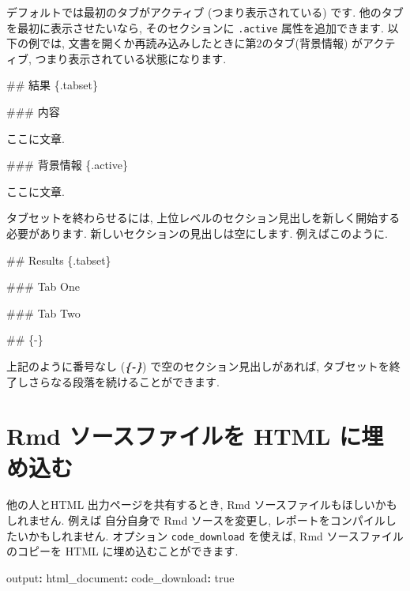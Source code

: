 \documentclass[
  11pt,
  lualatex,ja=standard,jafont=noto]{bxjsreport}
\newenvironment{Shaded}{\begin{snugshade}}{\end{snugshade}}
\newcommand{\AttributeTok}[1]{\textcolor[rgb]{0.77,0.63,0.00}{#1}}
\newcommand{\CharTok}[1]{\textcolor[rgb]{0.31,0.60,0.02}{#1}}
\newcommand{\FunctionTok}[1]{\textcolor[rgb]{0.00,0.00,0.00}{#1}}
\newcommand{\InformationTok}[1]{\textcolor[rgb]{0.56,0.35,0.01}{\textbf{\textit{#1}}}}
\newcommand{\KeywordTok}[1]{\textcolor[rgb]{0.13,0.29,0.53}{\textbf{#1}}}
\newcommand{\NormalTok}[1]{#1}
\begin{document}
デフォルトでは最初のタブがアクティブ (つまり表示されている) です. 他のタブを最初に表示させたいなら, そのセクションに \texttt{.active} 属性を追加できます. 以下の例では, 文書を開くか再読み込みしたときに第2のタブ(背景情報) がアクティブ, つまり表示されている状態になります.

\begin{Shaded}
\begin{Highlighting}[]
\FunctionTok{\#\# 結果 \{.tabset\}}

\FunctionTok{\#\#\# 内容}

\NormalTok{ここに文章.}

\FunctionTok{\#\#\# 背景情報 \{.active\}}

\NormalTok{ここに文章.}
\end{Highlighting}
\end{Shaded}

タブセットを終わらせるには, 上位レベルのセクション見出しを新しく開始する必要があります. 新しいセクションの見出しは空にします. 例えばこのように.

\begin{Shaded}
\begin{Highlighting}[]
\FunctionTok{\#\# Results \{.tabset\}}

\FunctionTok{\#\#\# Tab One}

\FunctionTok{\#\#\# Tab Two}

\FunctionTok{\#\# \{{-}\}}

\NormalTok{上記のように番号なし (}\InformationTok{\textasciigrave{}\{{-}\}\textasciigrave{}}\NormalTok{) で空のセクション見出しがあれば,}
\NormalTok{タブセットを終了しさらなる段落を続けることができます.}
\end{Highlighting}
\end{Shaded}

\hypertarget{embed-rmd}{%
\section{Rmd ソースファイルを HTML に埋め込む}\label{embed-rmd}}

他の人とHTML 出力ページを共有するとき, Rmd ソースファイルもほしいかもしれません. 例えば 自分自身で Rmd ソースを変更し, レポートをコンパイルしたいかもしれません. オプション \texttt{code\_download} を使えば, Rmd ソースファイルのコピーを HTML に埋め込むことができます.

\begin{Shaded}
\begin{Highlighting}[]
\FunctionTok{output}\KeywordTok{:}
\AttributeTok{  }\FunctionTok{html\_document}\KeywordTok{:}
\AttributeTok{    }\FunctionTok{code\_download}\KeywordTok{:}\AttributeTok{ }\CharTok{true}
\end{Highlighting}
\end{Shaded}
\end{document}
